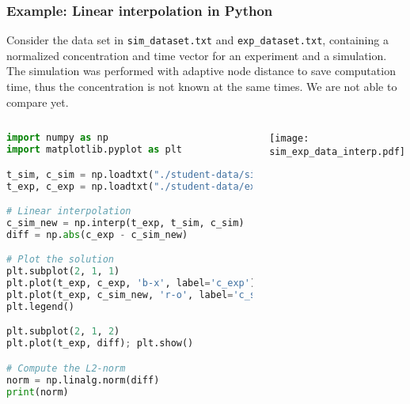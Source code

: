 \begin{frame}[t,fragile]
  \frametitle{Example: Linear interpolation in Python}
  \footnotesize\selectfont
  Consider the data set in \lstinline$sim_dataset.txt$ and \lstinline$exp_dataset.txt$, containing a normalized concentration and time vector for an experiment and a simulation. The simulation was performed with adaptive node distance to save computation time, thus the concentration is not known at the same times. We are not able to compare yet.
  \vfill
 \begin{columns}
  \begin{lstlisting}[language=Python,basicstyle=\tiny]
import numpy as np
import matplotlib.pyplot as plt

t_sim, c_sim = np.loadtxt("./student-data/sim_data.txt").T
t_exp, c_exp = np.loadtxt("./student-data/exp_data.txt").T

# Linear interpolation
c_sim_new = np.interp(t_exp, t_sim, c_sim)
diff = np.abs(c_exp - c_sim_new)

# Plot the solution
plt.subplot(2, 1, 1)
plt.plot(t_exp, c_exp, 'b-x', label='c_exp')
plt.plot(t_exp, c_sim_new, 'r-o', label='c_sim_new')
plt.legend()

plt.subplot(2, 1, 2)
plt.plot(t_exp, diff); plt.show()

# Compute the L2-norm
norm = np.linalg.norm(diff)
print(norm)
  \end{lstlisting}
  \texttt{[image: sim\_exp\_data\_interp.pdf]}
\end{columns}
\end{frame}



